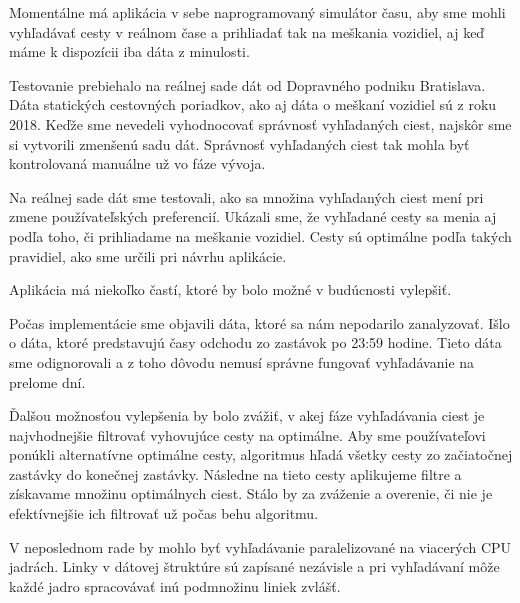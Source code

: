 Momentálne má aplikácia v sebe naprogramovaný simulátor času, aby sme mohli vyhľadávať cesty v reálnom čase a prihliadať tak na meškania vozidiel, aj keď máme k dispozícii iba dáta z minulosti. 

Testovanie prebiehalo na reálnej sade dát od Dopravného podniku Bratislava. Dáta statických cestovných poriadkov, ako aj dáta o meškaní vozidiel sú z roku 2018. Keďže sme nevedeli vyhodnocovať správnosť vyhľadaných ciest, najskôr sme si vytvorili zmenšenú sadu dát. Správnosť vyhľadaných ciest tak mohla byť kontrolovaná manuálne už vo fáze vývoja. 

Na reálnej sade dát sme testovali, ako sa množina vyhľadaných ciest mení pri zmene používateľských preferencií. Ukázali sme, že vyhľadané cesty sa menia aj podľa toho, či prihliadame na meškanie vozidiel. Cesty sú optimálne podľa takých pravidiel, ako sme určili pri návrhu aplikácie. 

Aplikácia má niekoľko častí, ktoré by bolo možné v budúcnosti vylepšiť. 

Počas implementácie sme objavili dáta, ktoré sa nám nepodarilo zanalyzovať. Išlo o dáta, ktoré predstavujú časy odchodu zo zastávok po 23:59 hodine. Tieto dáta sme odignorovali a z toho dôvodu nemusí správne fungovať vyhľadávanie na prelome dní. 

Ďalšou možnosťou vylepšenia by bolo zvážiť, v akej fáze vyhľadávania ciest je najvhodnejšie filtrovať vyhovujúce cesty na optimálne. Aby sme používateľovi ponúkli alternatívne optimálne cesty, algoritmus hľadá všetky cesty zo začiatočnej zastávky do konečnej zastávky. Následne na tieto cesty aplikujeme filtre a získavame množinu optimálnych ciest. Stálo by za zváženie a overenie, či nie je efektívnejšie ich filtrovať už počas behu algoritmu.

V neposlednom rade by mohlo byť vyhľadávanie paralelizované na viacerých CPU jadrách. Linky v dátovej štruktúre sú zapísané nezávisle a pri vyhľadávaní môže každé jadro spracovávať inú podmnožinu liniek zvlášť.

